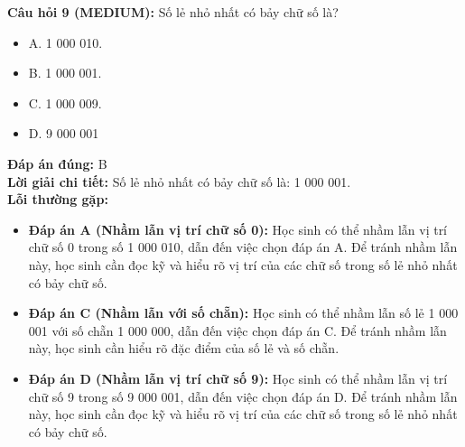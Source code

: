 \documentclass{article}
\begin{document}
\begin{minipage}{\textwidth}
\noindent\textbf{Câu hỏi 9 (MEDIUM):} Số lẻ nhỏ nhất có bảy chữ số là? 
\begin{itemize}[label={}]
    \item A. 1 000 010.
    \item B. 1 000 001.
    \item C. 1 000 009.
    \item D. 9 000 001
\end{itemize}
\textbf{Đáp án đúng:} B \\
\textbf{Lời giải chi tiết:} Số lẻ nhỏ nhất có bảy chữ số là: 1 000 001. \\
\textbf{Lỗi thường gặp:}
\begin{itemize}
  \item \textbf{Đáp án A (Nhầm lẫn vị trí chữ số 0):} Học sinh có thể nhầm lẫn vị trí chữ số 0 trong số 1 000 010, dẫn đến việc chọn đáp án A. Để tránh nhầm lẫn này, học sinh cần đọc kỹ và hiểu rõ vị trí của các chữ số trong số lẻ nhỏ nhất có bảy chữ số.
  \item \textbf{Đáp án C (Nhầm lẫn với số chẵn):} Học sinh có thể nhầm lẫn số lẻ 1 000 001 với số chẵn 1 000 000, dẫn đến việc chọn đáp án C. Để tránh nhầm lẫn này, học sinh cần hiểu rõ đặc điểm của số lẻ và số chẵn.
  \item \textbf{Đáp án D (Nhầm lẫn vị trí chữ số 9):} Học sinh có thể nhầm lẫn vị trí chữ số 9 trong số 9 000 001, dẫn đến việc chọn đáp án D. Để tránh nhầm lẫn này, học sinh cần đọc kỹ và hiểu rõ vị trí của các chữ số trong số lẻ nhỏ nhất có bảy chữ số.
\end{itemize}
\end{minipage}
\vspace{1em}
\end{document}
